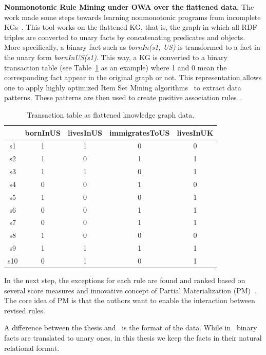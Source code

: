 \textbf{Nonmonotonic Rule Mining under OWA over the flattened data.} The work made some steps towards learning nonmonotonic programs from incomplete KGs~\cite{ref12}. This tool works on the flattened KG, that is, the graph in which all RDF triples are converted to unary facts by concatenating predicates and objects. More specifically, a binary fact such as \textit{bornIn(s1, US)} is transformed to a fact in the unary form \textit{bornInUS(s1)}. This way, a KG is converted to a binary transaction table (see Table~\ref{table2} as an example) where 1 and 0 mean the corresponding fact appear in the original graph or not. This representation allows one to apply highly optimized Item Set Mining algorithms~\cite{ref37} to extract data patterns. These patterns are then used to create positive association rules~\cite{ref13}.

\begin{table}
\begin{center}
\begin{tabular}{|c|c|c|c|c|}
\hline
 & bornInUS & livesInUS & immigratesToUS & livesInUK\\
\hline\hline
s1 & 1 & 1 & 0 & 0\\
\hline
s2 & 1 & 0 & 1 & 1\\
\hline
s3 & 1 & 1 & 0 & 1\\
\hline
s4 & 0 & 0 & 1 & 0\\
\hline
s5 & 1 & 0 & 0 & 1\\
\hline
s6 & 0 & 0 & 1 & 1\\
\hline
s7 & 0 & 0 & 1 & 1\\
\hline
s8 & 1 & 0 & 0 & 0\\
\hline
s9 & 1 & 1 & 1 & 1\\
\hline
s10 & 0 & 1 & 0 & 1\\
\hline
\end{tabular}
\end{center}
\caption{Transaction table as flattened knowledge graph data.}
\label{table2}
\end{table}

In the next step, the exceptions for each rule are found and ranked based on several score measures and innovative concept of Partial Materialization (PM)~\cite{ref12}. The core idea of PM is that the authors want to enable the interaction between revised rules.

A difference between the thesis and~\cite{ref12} is the format of the data. While in~\cite{ref12} binary facts are translated to unary ones, in this thesis we keep the facts in their natural relational format.

